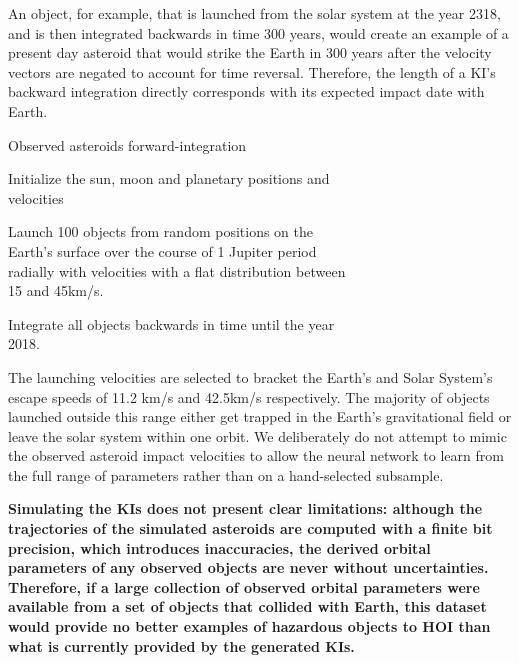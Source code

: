 \documentclass{aa}
\begin{document}
An object, for example, that is launched from the solar system at the year 2318, and is then integrated backwards in time 300 years, would create an example of a present day asteroid that would strike the Earth in 300 years after the velocity vectors are negated to account for time reversal. Therefore, the length of a KI's backward integration directly corresponds with its expected impact date with Earth. 

\begin{algorithm}[h]
\caption{Observed asteroids forward-integration}\label{generate-ki}
\begin{algorithmic}[1]
            \State \parbox[t]{\dimexpr\textwidth-\leftmargin-\labelsep-\labelwidth}{Initialize the sun, moon and planetary positions and \\ velocities}
            \State \parbox[t]{\dimexpr\textwidth-\leftmargin-\labelsep-\labelwidth}{Launch 100 objects from random positions on the \\ Earth's surface over the course of 1 Jupiter period \\ radially with velocities with a flat distribution between \\ 15 and 45km/s.}
            \State \parbox[t]{\dimexpr\textwidth-\leftmargin-\labelsep-\labelwidth}{Integrate all objects backwards in time until the year \\ 2018.}
            
\EndFor
\end{algorithmic}
\end{algorithm}

The launching velocities are selected to bracket the Earth's and Solar System's escape speeds of 11.2 km/s and 42.5km/s respectively. The majority of objects launched outside this range either get trapped in the Earth's gravitational field or leave the solar system within one orbit. We deliberately do not attempt to mimic the observed asteroid impact velocities to allow the neural network to learn from the full range of parameters rather than on a hand-selected subsample. 

\textbf{Simulating the KIs does not present clear limitations: although the trajectories of the simulated asteroids are computed with a finite bit precision, which introduces inaccuracies, the derived orbital parameters of any observed objects are never without uncertainties. Therefore, if a large collection of observed orbital parameters were available from a set of objects that collided with Earth, this dataset would provide no better examples of hazardous objects to HOI than what is currently provided by the generated KIs.}
\end{document}
